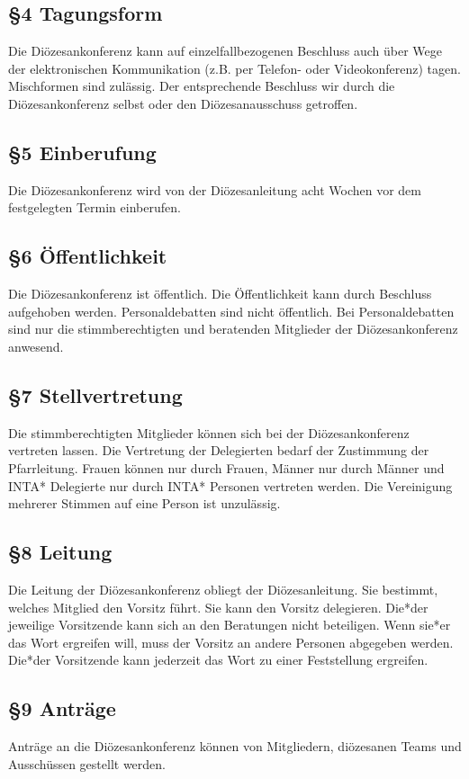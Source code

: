 \documentclass[12pt]{report}
\begin{document}
\begin{justify}
\subsection*{§4 Tagungsform}
Die Diözesankonferenz kann auf einzelfallbezogenen Beschluss auch über Wege der elektronischen Kommunikation (z.B. per Telefon- oder Videokonferenz) tagen. Mischformen sind zulässig. Der entsprechende Beschluss wir durch die
Diözesankonferenz selbst oder den Diözesanausschuss getroffen.
\subsection*{§5 Einberufung}
Die Diözesankonferenz wird von der Diözesanleitung acht Wochen vor dem festgelegten Termin einberufen.
\subsection*{§6 Öffentlichkeit}
Die Diözesankonferenz ist öffentlich. Die Öffentlichkeit kann durch Beschluss aufgehoben werden.
Personaldebatten sind nicht öffentlich. Bei Personaldebatten sind nur die stimmberechtigten und beratenden
Mitglieder der Diözesankonferenz anwesend.
\subsection*{§7 Stellvertretung}
Die stimmberechtigten Mitglieder können sich bei der Diözesankonferenz vertreten lassen. Die Vertretung
der Delegierten bedarf der Zustimmung der Pfarrleitung. Frauen können nur durch Frauen, Männer nur durch
Männer und INTA* Delegierte nur durch INTA* Personen vertreten werden. Die Vereinigung mehrerer Stimmen auf eine Person ist unzulässig.
\subsection*{§8 Leitung}
Die Leitung der Diözesankonferenz obliegt der Diözesanleitung. Sie bestimmt, welches Mitglied den Vorsitz
führt. Sie kann den Vorsitz delegieren. Die*der jeweilige Vorsitzende kann sich an den Beratungen nicht beteiligen.
Wenn sie*er das Wort ergreifen will, muss der Vorsitz an andere Personen abgegeben werden.
Die*der Vorsitzende kann jederzeit das Wort zu einer Feststellung ergreifen.
\subsection*{§9 Anträge}
Anträge an die Diözesankonferenz können von Mitgliedern, diözesanen Teams und Ausschüssen gestellt werden.


\end{justify}
\end{document}
